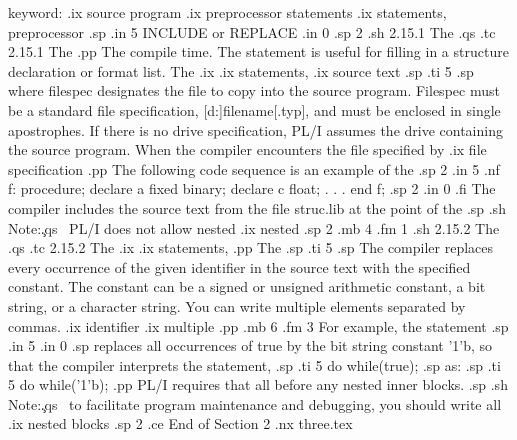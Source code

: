 keyword:
.ix source program
.ix preprocessor statements
.ix statements, preprocessor
.sp
.in 5
INCLUDE   or   REPLACE
.in 0
.sp 2
.sh
2.15.1  The %
.qs
.tc         2.15.1  The %
.pp
The %
compile time.  The statement is useful for filling in a structure declaration 
or format list.  The %
.ix %
.ix statements, %
.ix source text
.sp
.ti 5
.sp
where filespec designates the file to copy into the source program.  Filespec 
must be a standard file specification, [d:]filename[.typ], and must
be enclosed in single apostrophes.  If there is no drive specification, PL/I 
assumes the drive containing the source program.  When the compiler 
encounters the %
file specified by %
.ix file specification
.pp
The following code sequence is an example of the %
.sp 2
.in 5
.nf
f:                                       
  procedure;                             
  declare a fixed binary;                
  declare c float;                       
    .                                    
    .                                    
    .                                    
end f;                                   
.sp 2
.in 0
.fi
The compiler includes the source text from the file struc.lib at the point 
of the %
.sp
.sh
Note:\c
.qs
\  PL/I does not allow nested %
.ix nested %
.sp 2
.mb 4
.fm 1
.sh
2.15.2  The %
.qs
.tc         2.15.2  The %
.ix %
.ix statements, %
.pp
The %
.sp
.ti 5
.sp
The compiler replaces every occurrence of the given identifier in the source 
text with the specified constant.  The constant can be a signed or unsigned 
arithmetic constant, a bit string, or a character string.  You can write 
multiple %
elements separated by commas.
.ix identifier
.ix multiple %
.pp
.mb 6
.fm 3
For example, the statement
.sp
.in 5
.in 0
.sp
replaces all occurrences of true by the bit string constant '1'b, so that the 
compiler interprets the statement,
.sp
.ti 5
do while(true);
.sp
as: 
.sp
.ti 5
do while('1'b);
.pp
PL/I requires that all %
before any nested inner blocks.  
.sp
.sh
Note:\c
.qs
\  to facilitate program maintenance and debugging, you should write all 
.ix nested blocks
.sp 2
.ce
End of Section 2
.nx three.tex

